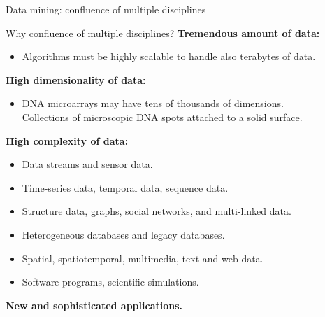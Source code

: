 \documentclass[aspectratio=169,t]{beamer}
\begin{document}
  { 
    \begin{frame}{Data mining: confluence of multiple disciplines}
    \centering
    \end{frame}
  }

  {
    \begin{frame}{Why confluence of multiple disciplines?}
    \textbf{Tremendous amount of data:}
    \begin{itemize}
        \item Algorithms must be highly scalable to handle also terabytes of data.
    \end{itemize}

    \textbf{High dimensionality of data:}
    \begin{itemize}
        \item DNA microarrays may have tens of thousands of dimensions.\\
              Collections of microscopic DNA spots attached to a solid surface.
    \end{itemize}

    \textbf{High complexity of data:}
    \begin{itemize}
        \item Data streams and sensor data.
        \item Time-series data, temporal data, sequence data.
        \item Structure data, graphs, social networks, and multi-linked data.
        \item Heterogeneous databases and legacy databases.
        \item Spatial, spatiotemporal, multimedia, text and web data.
        \item Software programs, scientific simulations.
    \end{itemize}
    \textbf{New and sophisticated applications.}
    \end{frame}
  }
\end{document}
